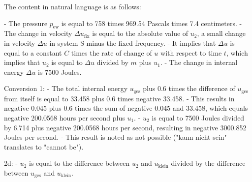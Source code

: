 The content in natural language is as follows:

- The pressure \( p_{\text{ew}} \) is equal to 758 times 969.54 Pascals times 7.4 centimeters.
- The change in velocity \( \Delta u_{\text{fix}} \) is equal to the absolute value of \( u_{2} \), a small change in velocity \( \Delta u \) in system S minus the fixed frequency.
- It implies that \( \Delta u \) is equal to a constant \( C \) times the rate of change of \( u \) with respect to time \( t \), which implies that \( u_{2} \) is equal to \( \Delta u \) divided by \( m \) plus \( u_{1} \).
- The change in internal energy \( \Delta u \) is 7500 Joules.

Conversion 1:
- The total internal energy \( u_{\text{ges}} \) plus 0.6 times the difference of \( u_{\text{ges}} \) from itself is equal to 33.458 plus 0.6 times negative 33.458.
- This results in negative 0.045 plus 0.6 times the sum of negative 0.045 and 33.458, which equals negative 200.0568 hours per second plus \( u_{1} \).
- \( u_{2} \) is equal to 7500 Joules divided by 6.714 plus negative 200.0568 hours per second, resulting in negative 3000.852 Joules per second.
- This result is noted as not possible ("kann nicht sein" translates to "cannot be").

2d:
- \( u_{2} \) is equal to the difference between \( u_{2} \) and \( u_{\text{klein}} \) divided by the difference between \( u_{\text{ges}} \) and \( u_{\text{klein}} \).